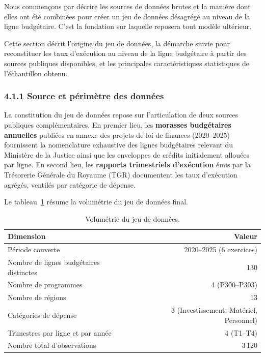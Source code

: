 \noindent Nous commen\c{c}ons par d\'ecrire les sources de donn\'ees brutes et la
mani\'ere dont elles ont \'et\'e combin\'ees pour cr\'eer un jeu de donn\'ees
d\'esagr\'eg\'e au niveau de la ligne budg\'etaire. C'est la fondation sur laquelle
reposera tout mod\`ele ult\'erieur.

Cette section d\'ecrit l'origine du jeu de donn\'ees, la d\'emarche suivie pour
reconstituer les taux d'ex\'ecution au niveau de la ligne budg\'etaire \`a partir
des sources publiques disponibles, et les principales caract\'eristiques
statistiques de l'\'echantillon obtenu.

\subsubsection*{4.1.1 \quad Source et p\'erim\`etre des donn\'ees}

La constitution du jeu de donn\'ees repose sur l'articulation de deux sources publiques
compl\'ementaires. En premier lieu, les \textbf{morasses budg\'etaires annuelles} publi\'ees
en annexe des projets de loi de finances (2020--2025) fournissent la nomenclature exhaustive
des lignes budg\'etaires relevant du Minist\`ere de la Justice ainsi que les enveloppes
de cr\'edits initialement allou\'ees par ligne. En second lieu, les \textbf{rapports
trimestriels d'ex\'ecution} \'emis par la Tr\'esorerie G\'en\'erale du Royaume (TGR)
documentent les taux d'ex\'ecution agr\'eg\'es, ventil\'es par cat\'egorie de d\'epense.

Le tableau~\ref{tab:volumetrie} r\'esume la volum\'etrie du jeu de donn\'ees final.

\begin{table}[H]
\centering\small
\caption{Volum\'etrie du jeu de donn\'ees.}
\label{tab:volumetrie}
\begin{tabular}{@{}lr@{}}
\toprule
\textbf{Dimension} & \textbf{Valeur} \\
\midrule
P\'eriode couverte                           & 2020--2025 (6 exercices) \\
Nombre de lignes budg\'etaires distinctes    & 130 \\
Nombre de programmes                         & 4 (P300--P303) \\
Nombre de r\'egions                          & 13 \\
Cat\'egories de d\'epense                    & 3 (Investissement, Mat\'eriel, Personnel) \\
Trimestres par ligne et par ann\'ee          & 4 (T1--T4) \\
Nombre total d'observations                  & 3\,120 \\
\bottomrule
\end{tabular}
\end{table}

